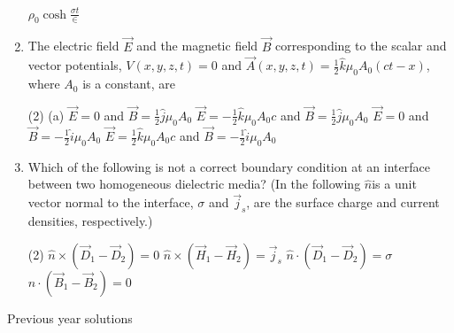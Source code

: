 \begin{enumerate}
\begin{tasks}
		\task[\textbf{D.}] $\rho_{0} \cosh \frac{\sigma t}{\in}$
	\end{tasks}
	\item  The electric field $\vec{E}$ and the magnetic field $\vec{B}$ corresponding to the scalar and vector potentials, $V(x, y, z, t)=0$ and $\vec{A}(x, y, z, t)=\frac{1}{2} \hat{k} \mu_{0} A_{0}(c t-x)$, where $A_{0}$ is a constant, are 
	{}
	\begin{tasks}(2)
		\task[\textbf{A.}] (a) $\vec{E}=0$ and $\vec{B}=\frac{1}{2} \hat{j} \mu_{0} A_{0}$
		\task[\textbf{B.}] $\vec{E}=-\frac{1}{2} \hat{k} \mu_{0} A_{0} c$ and $\vec{B}=\frac{1}{2} \hat{j} \mu_{0} A_{0}$
		\task[\textbf{C.}]  $\vec{E}=0$ and $\vec{B}=-\frac{1}{2} \hat{i} \mu_{0} A_{0}$
		\task[\textbf{D.}] $\vec{E}=\frac{1}{2} \hat{k} \mu_{0} A_{0} c$ and $\vec{B}=-\frac{1}{2} \hat{i} \mu_{0} A_{0}$
	\end{tasks}
	\item Which of the following is not a correct boundary condition at an interface between two homogeneous dielectric media? (In the following $\hat{n}$is a unit vector normal to the  interface, $\sigma$ and $\vec{j}_s$, are the surface charge and current densities, respectively.)
	{}
	\begin{tasks}(2)
		\task[\textbf{A.}] $\hat{n} \times\left(\vec{D}_{1}-\vec{D}_{2}\right)=0$
		\task[\textbf{B.}] $\hat{n} \times\left(\vec{H}_{1}-\vec{H}_{2}\right)=\vec{j}_{s}$
		\task[\textbf{C.}] $\hat{n} \cdot\left(\vec{D}_{1}-\vec{D}_{2}\right)=\sigma$
		\task[\textbf{D.}] $\hat{n} \cdot\left(\vec{B}_{1}-\vec{B}_{2}\right)=0$
	\end{tasks}
\end{enumerate}
\newpage
\begin{abox}
	Previous year solutions
	\end{abox}

